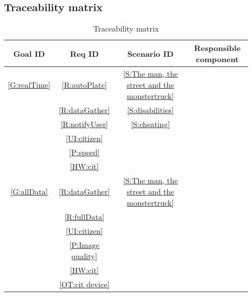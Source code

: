 \subsection{Traceability matrix}
		\begin{table}[H]
			\begin{center}
			\caption{Traceability matrix}
			\small
			\label{Trace matrix}
			\begin{tabular}{|c|c|c|c|}
			\hline
				\textbf{Goal ID} & \textbf{Req ID} & \textbf{Scenario ID}	&	\textbf{Responsible component}\\
			\hline
				\ref{G:realTime} 			&\ref{R:autoPlate}						&\ref{S:The man,
																					the street and the
																					monstertruck}				&\\
											&\ref{R:dataGather}						&\ref{S:disabilities}		&\\
											&\ref{R:notifyUser}						&\ref{S:cheating}			&\\
											&\ref{UI:citizen} 						&							&\\
											&\ref{P:speed}							&							&\\
											&\ref{HW:cit}							&							&\\
			\hline
				\ref{G:allData} 				&\ref{R:dataGather} 						&\ref{S:The man,
																					the street and the
																					monstertruck}				&\\
											&\ref{R:fullData} 						&							&\\
											&\ref{UI:citizen}						&							&\\
											&\ref{P:Image quality}					&							&\\
											&\ref{HW:cit}							&							&\\	
											&\ref{OT:cit device}						&							&\\	
											

\end{tabular}
\end{center}
\end{table}
